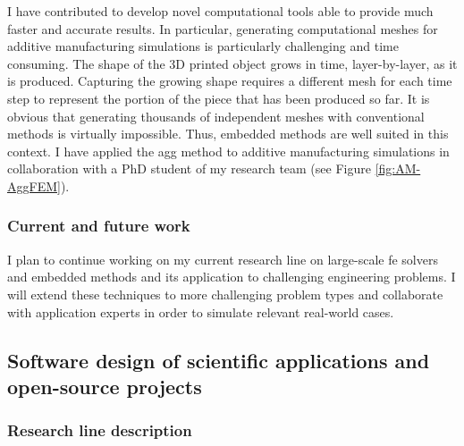 \documentclass{article}
\begin{document}
I have contributed to develop novel computational tools able to provide much faster and accurate results. In particular, generating computational meshes for additive manufacturing simulations is particularly challenging and time consuming. The shape of the 3D printed object grows in time, layer-by-layer, as it is produced. Capturing the growing shape requires a different mesh for each time step to represent the portion of the piece that has been produced so far. It is obvious that generating thousands of independent meshes with conventional methods is virtually impossible.  Thus, embedded methods are well suited in this context. {{I have applied the \ac{agg} method to additive manufacturing simulations}} in collaboration with a PhD student of my research team (see Figure \ref{fig:AM-AggFEM}). %

\subsubsection{Current and future work}

 I plan to continue working on my current research line on large-scale \ac{fe} solvers and embedded  methods and its application to challenging engineering problems. I will extend these techniques to more challenging problem types and collaborate with application experts in order to simulate relevant real-world cases.
 
 
\subsection{Software design of scientific applications and open-source projects}

\subsubsection{Research line description}
\end{document}
